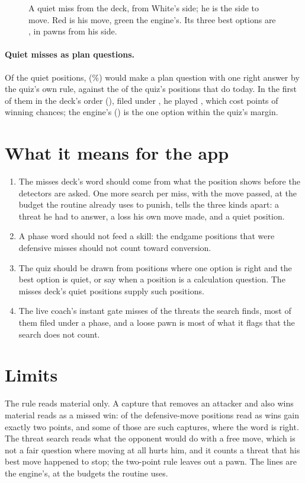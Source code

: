 \documentclass[11pt]{article}
\begin{document}
\begin{figure}[h]
\centering
\QuietBoard
\caption{A quiet miss from the deck, from White's side; he is the side to move. Red is his move,
green the engine's. Its three best options are \QuietOptions, in pawns from his side.}
\end{figure}

\paragraph{Quiet misses as plan questions.} Of the \Quiet{} quiet positions, \QuietQuiz{}
(\QuietQuizShare\%) would make a plan question with one right answer by the quiz's own rule, against
the \PlanQuestions{} of the quiz's \Quizzes{} positions that do today. In the first of them in the
deck's order (\QuietFen), filed under \QuietTheme, he played \QuietPlayed, which cost \QuietDrop{}
points of winning chances; the engine's \QuietLine{} (\QuietUci) is the one option within the
quiz's margin.

\section{What it means for the app}

\begin{enumerate}[nosep]
\item The misses deck's word should come from what the position shows before the detectors are
asked. One more search per miss, with the move passed, at the budget the routine already uses
to punish, tells the three kinds apart: a threat he had to answer, a loss his own move made, and a
quiet position.
\item A phase word should not feed a skill: the endgame positions that were defensive misses
should not count toward conversion.
\item The quiz should be drawn from positions where one option is right and the best option is
quiet, or say when a position is a calculation question. The misses deck's quiet positions supply
\QuietQuiz{} such positions.
\item The live coach's instant gate misses \GateMissed{} of the \Threatened{} threats the search
finds, most of them filed under a phase, and a loose pawn is most of what it flags that the search
does not count.
\end{enumerate}

\section{Limits}

The rule reads material only. A capture that removes an attacker and also wins material reads as
a missed win: \DefWinsSmall{} of the \DefWins{} defensive-move positions read as wins gain
exactly two points, and some of those are such captures, where the word is right. The threat
search reads what the opponent would do with a free move, which is not a fair question where
moving at all hurts him, and it counts a threat that his best move happened to stop; the two-point
rule leaves out a pawn. The lines are the engine's, at the budgets the routine uses.
\end{document}
